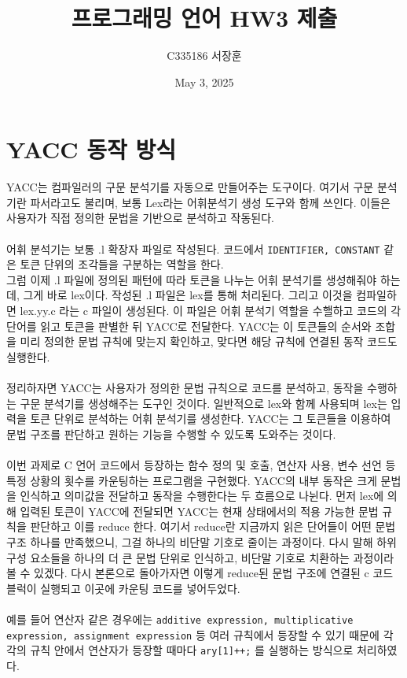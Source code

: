 \documentclass{article}
\title{프로그래밍 언어 HW3 제출}
\author{C335186 서장훈}
\date{May 3, 2025}
\begin{document}
\maketitle

\section{YACC 동작 방식}


YACC는 컴파일러의 구문 분석기를 자동으로 만들어주는 도구이다. 여기서 구문 분석기란 파서라고도 불리며, 보통 Lex라는 어휘분석기 생성 도구와 함께 쓰인다. 이들은 사용자가 직접 정의한 문법을 기반으로 분석하고 작동된다. \\
\\
어휘 분석기는 보통 .l 확장자 파일로 작성된다. 코드에서 \texttt{IDENTIFIER, CONSTANT} 같은 토큰 단위의 조각들을 구분하는 역할을 한다. \\
그럼 이제 .l 파일에 정의된 패턴에 따라 토큰을 나누는 어휘 분석기를 생성해줘야 하는데, 그게 바로 lex이다. 작성된 .l 파일은 lex를 통해 처리된다. 그리고 이것을 컴파일하면 lex.yy.c 라는 c 파일이 생성된다. 이 파일은 어휘 분석기 역할을 수핼하고 코드의 각 단어를 읽고 토큰을 판별한 뒤 YACC로 전달한다. YACC는 이 토큰들의 순서와 조합을 미리 정의한 문법 규칙에 맞는지 확인하고, 맞다면 해당 규칙에 연결된 동작 코드도 실행한다. \\
\\
정리하자면 YACC는 사용자가 정의한 문법 규칙으로 코드를 분석하고, 동작을 수행하는 구문 분석기를 생성해주는 도구인 것이다. 일반적으로 lex와 함께 사용되며 lex는 입력을 토큰 단위로 분석하는 어휘 분석기를 생성한다. YACC는 그 토큰들을 이용하여 문법 구조를 판단하고 원하는 기능을 수행할 수 있도록 도와주는 것이다. \\
\\
이번 과제로 C 언어 코드에서 등장하는 함수 정의 및 호출, 연산자 사용, 변수 선언 등 특정 상황의 횟수를 카운팅하는 프로그램을 구현했다. 
YACC의 내부 동작은 크게 문법을 인식하고 의미값을 전달하고 동작을 수행한다는 두 흐름으로 나뉜다. 먼저 lex에 의해 입력된 토큰이 YACC에 전달되면 YACC는 현재 상태에서의 적용 가능한 문법 규칙을 판단하고 이를 reduce 한다. 여기서 reduce란 지금까지 읽은 단어들이 어떤 문법 구조 하나를 만족했으니, 그걸 하나의 비단말 기호로 줄이는 과정이다. 다시 말해 하위 구성 요소들을 하나의 더 큰 문법 단위로 인식하고, 비단말 기호로 치환하는 과정이라 볼 수 있겠다. 다시 본론으로 돌아가자면 이렇게 reduce된 문법 구조에 연결된 c 코드블럭이 실행되고 이곳에 카운팅 코드를 넣어두었다. \\
\\
예를 들어 연산자 같은 경우에는  \texttt{additive expression, multiplicative expression, assignment expression} 등 여러 규칙에서 등장할 수 있기 때문에 각각의 규칙 안에서 연산자가 등장할 때마다 \texttt{ary[1]++;} 를 실행하는 방식으로 처리하였다.
\end{document}
